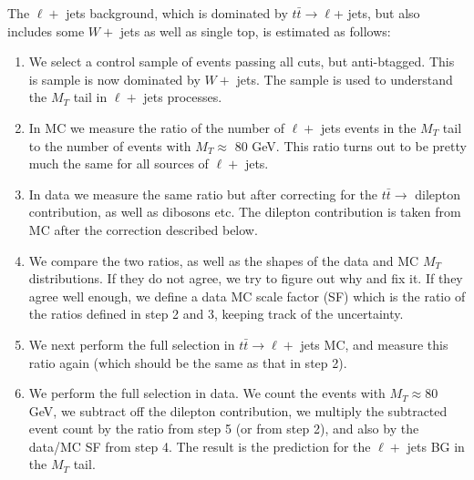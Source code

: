 The $\ell +$ jets background, which is dominated by 
$t\bar{t} \to \ell $+ jets, but also includes some $W +$ jets as well as single top,
is estimated as follows:
\begin{enumerate}
\item We select a control sample of events passing all cuts, but anti-btagged.  This is 
sample is now dominated by $W +$ jets.  The sample is used to understand the
$M_T$ tail in $\ell +$ jets processes. 
\item In MC we measure the ratio of the number of $\ell +$ jets events in the $M_T$ tail to
the number of events with $M_T \approx$ 80 GeV.  This ratio turns out to be pretty much the
same for all sources of $\ell +$ jets.
\item In data we measure the same ratio but after correcting for the $t\bar{t} \to$ dilepton
contribution, as well as dibosons etc.  The dilepton contribution is taken from MC after 
the correction described below.  
\item We compare the two ratios, as well as the shapes of the data and MC $M_T$ distributions. 
If they do not agree, we try to figure out why and fix it.  If they agree well enough, we define a 
data MC scale factor (SF) which is the ratio of the  ratios defined in step 2 and 3, keeping track of the 
uncertainty.  
\item We next perform the full selection in $t\bar{t} \to \ell +$ jets MC, and measure this ratio
again (which should be the same as that in step 2).
\item We perform the full selection in data.  We count the events with $M_T \approx 80$ GeV, we
subtract off the dilepton contribution, we multiply the subtracted event count by the ratio from step 5 (or from 
step 2), and also by the data/MC SF from step 4.  The result is the prediction for the $\ell +$ jets BG in 
the $M_T$ tail.
\end{enumerate}

